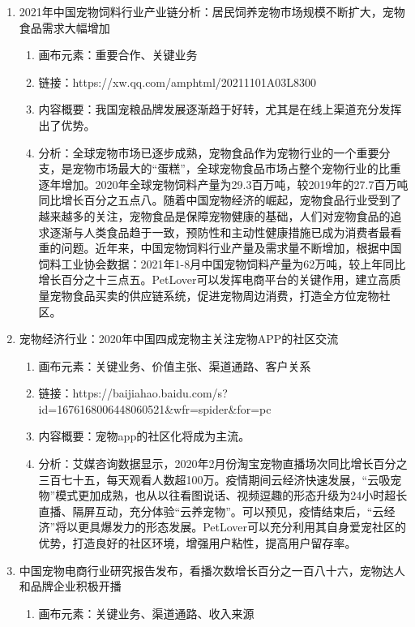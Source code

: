 \documentclass[a4paper]{ctexart}
\begin{document}
\begin{enumerate}[label=\alph*.]
\begin{enumerate}[label=\alph*.]
  \end{enumerate}
  \item 2021年中国宠物饲料行业产业链分析：居民饲养宠物市场规模不断扩大，宠物食品需求大幅增加
  \begin{enumerate}[label=\alph*.]
    \item 画布元素：重要合作、关键业务
    \item 链接：https://xw.qq.com/amphtml/20211101A03L8300
    \item 内容概要：我国宠粮品牌发展逐渐趋于好转，尤其是在线上渠道充分发挥出了优势。
    \item 分析：全球宠物市场已逐步成熟，宠物食品作为宠物行业的一个重要分支，是宠物市场最大的“蛋糕”，全球宠物食品市场占整个宠物行业的比重逐年增加。2020年全球宠物饲料产量为29.3百万吨，较2019年的27.7百万吨同比增长百分之五点八。随着中国宠物经济的崛起，宠物食品行业受到了越来越多的关注，宠物食品是保障宠物健康的基础，人们对宠物食品的追求逐渐与人类食品趋于一致，预防性和主动性健康措施已成为消费者最看重的问题。近年来，中国宠物饲料行业产量及需求量不断增加，根据中国饲料工业协会数据：2021年1-8月中国宠物饲料产量为62万吨，较上年同比增长百分之十三点五。PetLover可以发挥电商平台的关键作用，建立高质量宠物食品买卖的供应链系统，促进宠物周边消费，打造全方位宠物社区。
  \end{enumerate}
  \item 宠物经济行业：2020年中国四成宠物主关注宠物APP的社区交流
  \begin{enumerate}[label=\alph*.]
    \item 画布元素：关键业务、价值主张、渠道通路、客户关系
    \item 链接：https://baijiahao.baidu.com/s?id=1676168006448060521\&wfr=spider\&for=pc
    \item 内容概要：宠物app的社区化将成为主流。
    \item 分析：艾媒咨询数据显示，2020年2月份淘宝宠物直播场次同比增长百分之三百七十五，每天观看人数超100万。疫情期间云经济快速发展，“云吸宠物”模式更加成熟，也从以往看图说话、视频逗趣的形态升级为24小时超长直播、隔屏互动，充分体验“云养宠物”。可以预见，疫情结束后，“云经济”将以更具爆发力的形态发展。PetLover可以充分利用其自身爱宠社区的优势，打造良好的社区环境，增强用户粘性，提高用户留存率。
  \end{enumerate}
  \item 中国宠物电商行业研究报告发布，看播次数增长百分之一百八十六，宠物达人和品牌企业积极开播
  \begin{enumerate}[label=\alph*.]
    \item 画布元素：关键业务、渠道通路、收入来源

\end{enumerate}
\end{enumerate}
\end{document}
